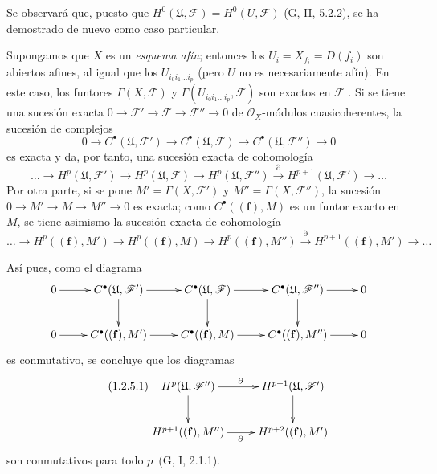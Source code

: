 Se observará que, puesto que $H^0(\mathfrak U,\mathcal F)=H^0(U,\mathcal F)$ (G, II, 5.2.2), se ha demostrado de nuevo  como caso particular.

\begin{remark}[1.2.5]
\label{III.1.2.5}
\label{III.1.2.5-fr}
Supongamos que $X$ es un \emph{esquema afín}; entonces los $U_i=X_{f_i}=D(f_i)$ son abiertos afines, al igual que los $U_{i_0i_1\ldots i_p}$ (pero $U$ no es necesariamente afín).
En este caso, los funtores $\Gamma(X,\mathcal F)$ y $\Gamma(U_{i_0i_1\ldots i_p},\mathcal F)$ son exactos en $\mathcal F$ .
Si se tiene una sucesión exacta $0\to\mathcal F'\to\mathcal F\to\mathcal F''\to0$ de $\mathcal O_X$-módulos cuasicoherentes, la sucesión de complejos
\[
0\longrightarrow C^\bullet(\mathfrak U,\mathcal F')
\longrightarrow C^\bullet(\mathfrak U,\mathcal F)
\longrightarrow C^\bullet(\mathfrak U,\mathcal F'')
\longrightarrow0
\]
es exacta y da, por tanto, una sucesión exacta de cohomología
\[
\ldots\longrightarrow H^p(\mathfrak U,\mathcal F')
\longrightarrow H^p(\mathfrak U,\mathcal F)
\longrightarrow H^p(\mathfrak U,\mathcal F'')
\xrightarrow{\partial}H^{p+1}(\mathfrak U,\mathcal F')
\longrightarrow\ldots
\]
Por otra parte, si se pone $M'=\Gamma(X,\mathcal F')$ y $M''=\Gamma(X,\mathcal F'')$, la sucesión $0\to M'\to M\to M''\to0$ es exacta; como $C^\bullet((\mathbf f),M)$ es un funtor exacto en $M$, se tiene asimismo la sucesión exacta de cohomología
\[
\ldots\longrightarrow H^p((\mathbf f),M')
\longrightarrow H^p((\mathbf f),M)
\longrightarrow H^p((\mathbf f),M'')
\xrightarrow{\partial}H^{p+1}((\mathbf f),M')
\longrightarrow\ldots
\]

Así pues, como el diagrama
\[
\xymatrix{
0\ar[r]&C^\bullet(\mathfrak U,\mathcal F')\ar[r]\ar[d]
&C^\bullet(\mathfrak U,\mathcal F)\ar[r]\ar[d]
&C^\bullet(\mathfrak U,\mathcal F'')\ar[r]\ar[d]&0\\
0\ar[r]&C^\bullet((\mathbf f),M')\ar[r]
&C^\bullet((\mathbf f),M)\ar[r]
&C^\bullet((\mathbf f),M'')\ar[r]&0
}
\]
es conmutativo, se concluye que los diagramas
\begin{equation}
\label{III.1.2.5.1-fr}
\tag{1.2.5.1}
\xymatrix{
H^p(\mathfrak U,\mathcal F'')\ar[r]^{\partial}\ar[d]
&H^{p+1}(\mathfrak U,\mathcal F')\ar[d]\\
H^{p+1}((\mathbf f),M'')\ar[r]_{\partial}
&H^{p+2}((\mathbf f),M')
}
\end{equation}
son conmutativos para todo $p$~(G, I, 2.1.1).
\end{remark}

